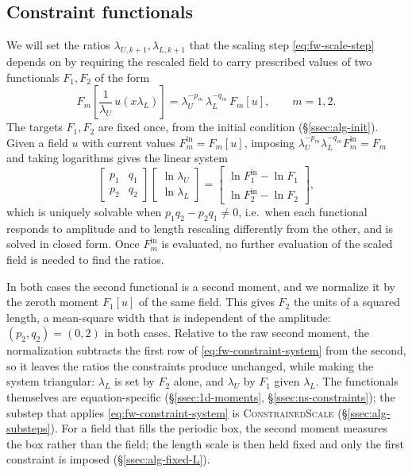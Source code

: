 \documentclass{article}
\begin{document}
\subsection{Constraint functionals}\label{ssec:fw-constraints}
We will set the ratios $\lambda_{U,k+1}, \lambda_{L,k+1}$ that the
scaling step \eqref{eq:fw-scale-step} depends on by requiring
the rescaled field to carry prescribed values of two functionals $F_1, F_2$ of the form
\begin{equation}\label{eq:fw-homogeneity}
  F_m\!\left[ \frac{1}{\lambda_U}\, u\!\left( x \lambda_L \right) \right]
  = \lambda_U^{-p_m}\, \lambda_L^{-q_m}\, F_m[u],
  \qquad m = 1, 2 .
\end{equation}
The targets $F_1, F_2$ are fixed once, from the initial condition
(\S\ref{ssec:alg-init}). Given a field $u$ with current values
$F_m^{\mathrm{in}} = F_m[u]$, imposing
$\lambda_U^{-p_m} \lambda_L^{-q_m} F_m^{\mathrm{in}} = F_m$ and taking
logarithms gives the linear system
\begin{equation}\label{eq:fw-constraint-system}
  \begin{bmatrix} p_1 & q_1 \\ p_2 & q_2 \end{bmatrix}
  \begin{bmatrix} \ln \lambda_U \\ \ln \lambda_L \end{bmatrix}
  = \begin{bmatrix} \ln F_1^{\mathrm{in}} - \ln F_1 \\ \ln F_2^{\mathrm{in}} - \ln F_2 \end{bmatrix},
\end{equation}
which is uniquely solvable when $p_1 q_2 - p_2 q_1 \neq 0$, i.e.\ when each
functional responds to amplitude and to length rescaling differently from the
other, and is solved in closed form. Once $F_m^{\mathrm{in}}$ is evaluated, no
further evaluation of the scaled field is needed to find the ratios.
\par
In both cases the second functional is a second moment, and we normalize it
by the zeroth moment $F_1[u]$ of the same field. This gives $F_2$ the units of
a squared length, a mean-square width that is independent of the amplitude:
$(p_2, q_2) = (0, 2)$ in both cases. Relative to the raw second moment, the
normalization subtracts the first row of \eqref{eq:fw-constraint-system} from
the second, so it leaves the ratios the constraints produce unchanged, while
making the system triangular: $\lambda_L$ is set by $F_2$ alone, and
$\lambda_U$ by $F_1$ given $\lambda_L$.
The functionals themselves are equation-specific
(\S\ref{ssec:1d-moments}, \S\ref{ssec:ns-constraints}); the substep that
applies \eqref{eq:fw-constraint-system} is \textsc{ConstrainedScale}
(\S\ref{ssec:alg-substeps}). For a field that fills the periodic box, the
second moment measures the box rather than the field; the length scale is
then held fixed and only the first constraint is imposed
(\S\ref{ssec:alg-fixed-L}).
\end{document}
